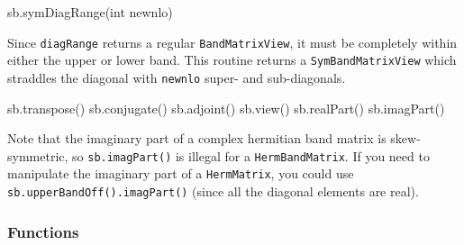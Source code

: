\documentclass[twoside,letterpaper,11pt]{article}
\renewcommand{\tt}[1]{{\lstinline {#1}}}
\begin{document}
\begin{tmvcode}
sb.symDiagRange(int newnlo)
\end{tmvcode}
Since \tt{diagRange} returns a regular \tt{BandMatrixView}, it must be completely
within either the upper or lower band.  This routine returns a \tt{SymBandMatrixView}
which straddles the diagonal with \tt{newnlo} super- and sub-diagonals.

\begin{tmvcode}
sb.transpose()
sb.conjugate()
sb.adjoint()
sb.view()
sb.realPart()
sb.imagPart()
\end{tmvcode}
Note that the imaginary part of a complex hermitian band matrix is
skew-symmetric, so \tt{sb.imagPart()} is illegal for a \tt{HermBandMatrix}.
If you need to manipulate the imaginary part of a \tt{HermMatrix}, 
you could use
\tt{sb.upperBandOff().imagPart()} 
(since all the diagonal elements are real).
\vspace{12pt}

\subsubsection{Functions}
\end{document}
